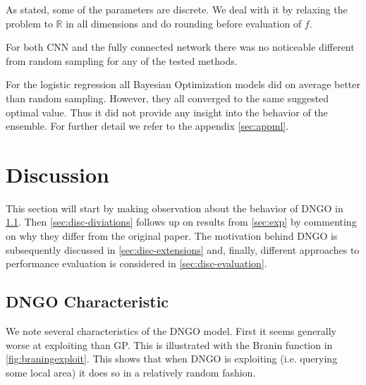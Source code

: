 \documentclass[conference,compsoc]{IEEEtran}
\theoremstyle{definition}
\begin{document}
        As stated, some of the parameters are discrete.
        We deal with it by relaxing the problem to $\mathbb{R}$ in all dimensions and do rounding before evaluation of $f$.

        For both CNN and the fully connected network there was no noticeable different from random sampling for any of the tested methods.

        For the logistic regression all Bayesian Optimization models did on average better than random sampling.
        However, they all converged to the same suggested optimal value.
        Thus it did not provide any insight into the behavior of the ensemble.
        For further detail we refer to the appendix \cref{sec:appml}.



\section{Discussion}\label{sec:discussion}

    This section will start by making observation about the behavior of DNGO in \cref{sec:disc-characteristic}.
    Then \cref{sec:disc-diviations} follows up on results from \cref{sec:exp} by commenting on why they differ from the original paper.
    The motivation behind DNGO is subsequently discussed in \cref{sec:disc-extensions} and, finally, different approaches to performance evaluation is considered in \cref{sec:disc-evaluation}.
    
    
    \subsection{DNGO Characteristic}\label{sec:disc-characteristic}

        We note several characteristics of the DNGO model.
        First it seems generally worse at exploiting than GP.
        This is illustrated with the Branin function in \cref{fig:braningexploit}.
        This shows that when DNGO is exploiting (i.e. querying some local area) it does so in a relatively random fashion.
\end{document}
